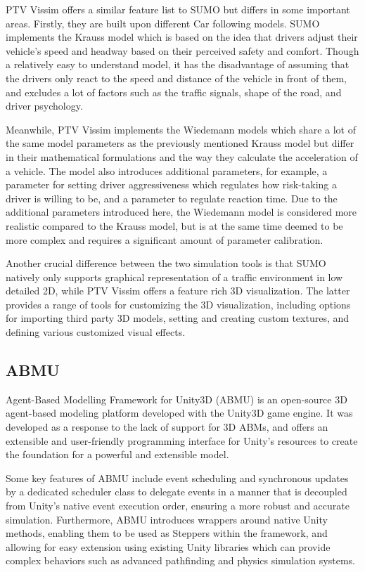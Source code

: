         PTV Vissim offers a similar feature list to SUMO but differs in some important areas. Firstly, they are built upon different Car following models. SUMO implements the Krauss model which is based on the idea that drivers adjust their vehicle’s speed and headway based on their perceived safety and comfort. Though a relatively easy to understand model, it has the disadvantage of assuming that the drivers only react to the speed and distance of the vehicle in front of them, and excludes a lot of factors such as the traffic signals, shape of the road, and driver psychology.

        Meanwhile, PTV Vissim implements the Wiedemann models which share a lot of the same model parameters as the previously mentioned Krauss model but differ in their mathematical formulations and the way they calculate the acceleration of a vehicle. The model also introduces additional parameters, for example, a parameter for setting driver aggressiveness which regulates how risk-taking a driver is willing to be, and a parameter to regulate reaction time. Due to the additional parameters introduced here, the Wiedemann model is considered more realistic compared to the Krauss model, but is at the same time deemed to be more complex and requires a significant amount of parameter calibration.

        Another crucial difference between the two simulation tools is that SUMO natively only supports graphical representation of a traffic environment in low detailed 2D, while PTV Vissim offers a feature rich 3D visualization. The latter provides a range of tools for customizing the 3D visualization, including options for importing third party 3D models, setting and creating custom textures, and defining various customized visual effects. 

    \subsection{ABMU}
        Agent-Based Modelling Framework for Unity3D (ABMU) is an open-source 3D agent-based modeling platform developed with the Unity3D game engine. It was developed as a response to the lack of support for 3D ABMs, and offers an extensible and user-friendly programming interface for Unity’s resources to create the foundation for a powerful and extensible model.

        Some key features of ABMU include event scheduling and synchronous updates by a dedicated scheduler class to delegate events in a manner that is decoupled from Unity’s native event execution order, ensuring a more robust and accurate simulation. Furthermore, ABMU introduces wrappers around native Unity methods, enabling them to be used as Steppers within the framework, and allowing for easy extension using existing Unity libraries which can provide complex behaviors such as advanced pathfinding and physics simulation systems.

